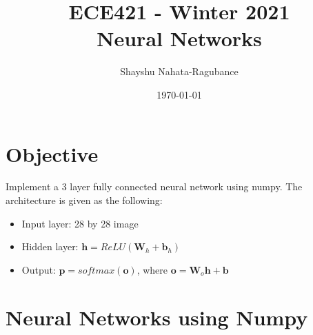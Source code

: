 \documentclass[12pt]{article}
\title{ECE421 - Winter 2021 \\ Neural Networks}
\author{Shayshu Nahata-Ragubance}
\date{\today}
\begin{document}
\maketitle

\section{Objective}
Implement a 3 layer fully connected neural network using numpy.
The architecture is given as the following:
\begin{itemize}
  \item Input layer: 28 by 28 image
  \item Hidden layer: $\mathbf{h} = ReLU(\mathbf{W}_h + \mathbf{b}_h)$
  \item Output: $\mathbf{p} = softmax(\mathbf{o})$, where $\mathbf{o} = \mathbf{W}_o \mathbf{h} + \mathbf{b}$
\end{itemize}

\section{Neural Networks using Numpy}
\end{document}

